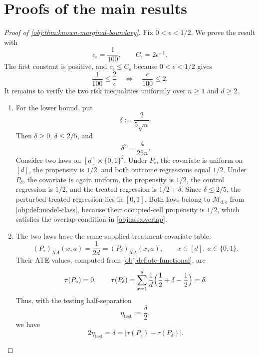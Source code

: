 \documentclass[11pt]{article}
\begin{document}
\section{Proofs of the main results}\label{sec:deferred-proofs}

\begin{proof}[Proof of \cref{obj:thm:known-marginal-boundary}]
Fix \(0<\epsilon<1/2\).  We prove the result with
\[
c_\epsilon=\frac1{100},
\qquad
C_\epsilon=2\epsilon^{-1}.
\]
The first constant is positive, and \(c_\epsilon\le C_\epsilon\) because \(0<\epsilon<1/2\) gives
\[
\frac1{100}\le \frac{2}{\epsilon}
\quad\Longleftrightarrow\quad
\frac{\epsilon}{100}\le 2 .
\]
It remains to verify the two risk inequalities uniformly over \(n\ge1\) and \(d\ge2\). %

\begin{enumerate}
\item
For the lower bound, put
\[
\delta:=\frac{2}{5\sqrt n}.
\]
Then \(\delta\ge0\), \(\delta\le2/5\), and
\[
\delta^2=\frac{4}{25n}.
\]
Consider two laws on \([d]\times\{0,1\}^2\).  Under \(P_{\circ}\), the covariate is uniform on \([d]\), the propensity is \(1/2\), and both outcome regressions equal \(1/2\).  Under \(P_{\delta}\), the covariate is again uniform, the propensity is \(1/2\), the control regression is \(1/2\), and the treated regression is \(1/2+\delta\).  Since \(\delta\le2/5\), the perturbed treated regression lies in \([0,1]\).  Both laws belong to \(\mathcal M_{d,\epsilon}\) from \cref{obj:def:model-class}, because their occupied-cell propensity is \(1/2\), which satisfies the overlap condition in \cref{obj:ass:overlap}. %

\item
The two laws have the same supplied treatment-covariate table:
\[
(P_{\circ})_{XA}(x,a)=\frac{1}{2d}=(P_{\delta})_{XA}(x,a),
\qquad x\in[d],\ a\in\{0,1\}.
\]
Their ATE values, computed from \cref{obj:def:ate-functional}, are
\[
\tau(P_{\circ})=0,
\qquad
\tau(P_{\delta})
=\sum_{x=1}^d \frac1d\Bigl(\frac12+\delta-\frac12\Bigr)
=\delta .
\]
Thus, with the testing half-separation
\[
\eta_{\mathrm{test}}:=\frac{\delta}{2},
\]
we have
\[
2\eta_{\mathrm{test}}=\delta
=\bigl|\tau(P_{\circ})-\tau(P_{\delta})\bigr|.
\]


\end{enumerate}
\end{proof}
\end{document}
